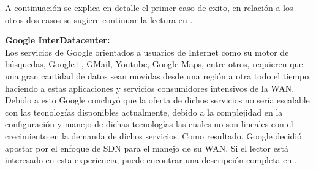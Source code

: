 A continuaci\'on se explica en detalle el primer caso de exito, en relaci\'on a los otros dos casos se sugiere continuar la lectura en \cite{ONFSuccessCase}.

\textbf{Google InterDatacenter:}\\

Los servicios de Google orientados a usuarios de Internet como su motor de búsquedas, Google+, GMail, Youtube, Google Maps, entre otros, requieren que una gran cantidad de datos sean movidas desde una región a otra todo el tiempo, haciendo a estas aplicaciones y servicios consumidores intensivos de la WAN. Debido a esto Google concluy\'o que la oferta de dichos servicios no sería escalable con las tecnologías disponibles actualmente, debido a la complejidad en la configuración y manejo de dichas tecnologías las cuales no son lineales con el crecimiento en la demanda de dichos servicios. Como resultado, Google decidió apostar por el enfoque de SDN para el manejo de su WAN. Si el lector est\'a interesado en esta experiencia, puede encontrar una descripción completa en \cite{jain2013b4}.


 


